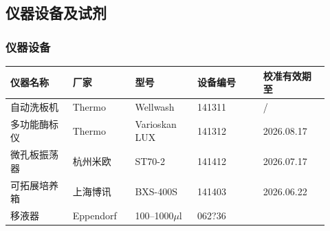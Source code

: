 \documentclass[UTF8,10pt,a4paper,fontset=fandol]{ctexart}
\newcommand{\fieldvalue}[1]{#1}
\newcommand{\handwritten}[1]{#1}
\begin{document}
\subsection{仪器设备及试剂}

\subsubsection{仪器设备}

\begin{tabular}{|p{0.18\linewidth}|p{0.18\linewidth}|p{0.18\linewidth}|p{0.19\linewidth}|p{0.19\linewidth}|}
\hline
仪器名称 & 厂家 & 型号 & 设备编号 & 校准有效期至 \\
\hline
自动洗板机 & Thermo & Wellwash &
\fieldvalue{\handwritten{141311}} &
\fieldvalue{\handwritten{/}} \\
\hline
多功能酶标仪 & Thermo & Varioskan LUX &
\fieldvalue{\handwritten{141312}} &
\fieldvalue{\handwritten{2026.08.17}} \\
\hline
微孔板振荡器 & 杭州米欧 & ST70-2 &
\fieldvalue{\handwritten{141412}} &
\fieldvalue{\handwritten{2026.07.17}} \\
\hline
可拓展培养箱 & 上海博讯 & BXS-400S &
\fieldvalue{\handwritten{141403}} &
\fieldvalue{\handwritten{2026.06.22}} \\
\hline
\multirow{4}{*}{移液器} & \multirow{4}{*}{Eppendorf} &
\fieldvalue{\handwritten{100--1000$\mu$l}} &
\fieldvalue{\handwritten{062?36}} &

\end{tabular}
\end{document}
